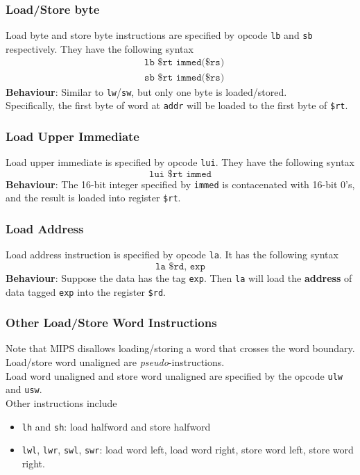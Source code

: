 \documentclass[12pt]{article}
\theoremstyle{definition}
\begin{document}
\subsubsection{Load/Store byte}
Load byte and store byte instructions are specified by opcode \texttt{lb} and \texttt{sb} respectively. They have the following syntax
\begin{align*}
&\texttt{lb \$rt immed(\$rs)}\\
&\texttt{sb \$rt immed(\$rs)}
\end{align*}
\textbf{Behaviour}: Similar to \texttt{lw}/\texttt{sw}, but only one byte is loaded/stored.\\
Specifically, the first byte of word at \texttt{addr} will be loaded to the first byte of \texttt{\$rt}.
\subsubsection{Load Upper Immediate}
Load upper immediate is specified by opcode \texttt{lui}. They have the following syntax
\[
\texttt{lui \$rt immed}
\]
\textbf{Behaviour}: The 16-bit integer specified by \texttt{immed} is contacenated with 16-bit 0's, and the result is loaded into register \texttt{\$rt}.
\subsubsection{Load Address}
Load address instruction is specified by opcode \texttt{la}. It has the following syntax
\[
\texttt{la \$rd, exp}
\]
\textbf{Behaviour}: Suppose the data has the tag \texttt{exp}. Then \texttt{la} will load the \textbf{address} of data tagged \texttt{exp} into the register \texttt{\$rd}.
\subsubsection{Other Load/Store Word Instructions}
Note that MIPS disallows loading/storing a word that crosses the word boundary. Load/store word unaligned are \textit{pseudo}-instructions.\\
Load word unaligned and store word unaligned are specified by the opcode \texttt{ulw} and \texttt{usw}.\\
Other instructions include
\begin{itemize}
  \item \texttt{lh} and \texttt{sh}: load halfword and store halfword
  \item \texttt{lwl}, \texttt{lwr}, \texttt{swl}, \texttt{swr}: load word left, load word right, store word left, store word right.
\end{itemize}
\end{document}
